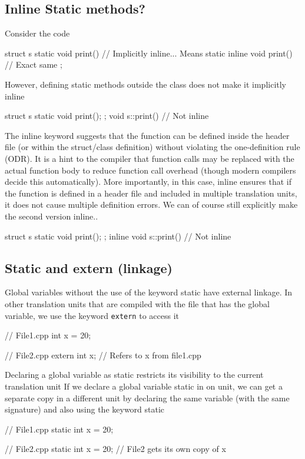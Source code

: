 \documentclass{report}
\begin{document}
    \subsection{Inline Static methods?}
    \bigbreak \noindent 
    Consider the code
    \bigbreak \noindent 
    \begin{cppcode}
        struct s{
            static void print() {} // Implicitly inline... Means
            static inline void print() {} // Exact same
        };
    \end{cppcode}
    \bigbreak \noindent 
    However, defining static methods outside the class does not make it implicitly inline
    \bigbreak \noindent 
    \begin{cppcode}
        struct s  {
            static void print();
        };
        void s::print() {} // Not inline
    \end{cppcode}
    \bigbreak \noindent 
    The inline keyword suggests that the function can be defined inside the header file (or within the struct/class definition) without violating the one-definition rule (ODR).
    \bigbreak \noindent 
    It is a hint to the compiler that function calls may be replaced with the actual function body to reduce function call overhead (though modern compilers decide this automatically).
    \bigbreak \noindent 
    More importantly, in this case, inline ensures that if the function is defined in a header file and included in multiple translation units, it does not cause multiple definition errors.
    \bigbreak \noindent 
    We can of course  still explicitly make the second version inline..
    \bigbreak \noindent 
    \begin{cppcode}
        struct s  {
            static void print();
        };
        inline void s::print() {} // Not inline
    \end{cppcode}

    \bigbreak \noindent 
    \subsection{Static and extern (linkage)}
    \bigbreak \noindent 
    Global variables without the use of the keyword static have external linkage. In other translation units that are compiled  with the file that has the global variable, we use the keyword \texttt{extern} to access it
    \bigbreak \noindent 
    \begin{cppcode}
    // File1.cpp
    int x = 20;

    // File2.cpp
    extern int x; // Refers to x from file1.cpp
    \end{cppcode}
    \bigbreak \noindent 
    Declaring a global variable as static restricts its visibility to the current translation unit
    \bigbreak \noindent 
    If we declare a global variable static in on unit, we can get a separate copy in a different unit by declaring the same variable (with the same signature) and also using the keyword static
    \bigbreak \noindent 
    \begin{cppcode}
    // File1.cpp
    static int x = 20;

    // File2.cpp
    static int x = 20; // File2 gets its own copy of x
    \end{cppcode}
\end{document}
